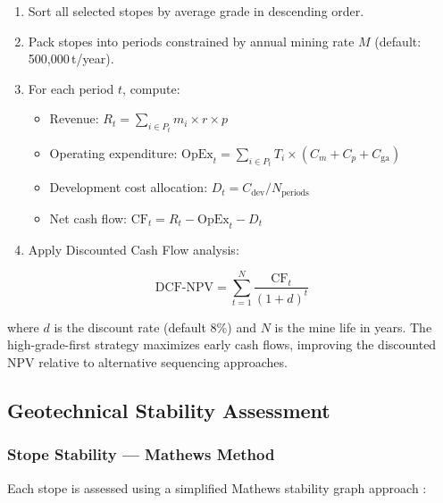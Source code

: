 \documentclass[12pt,a4paper]{article}
\begin{document}
\begin{enumerate}
    \item Sort all selected stopes by average grade in descending order.
    \item Pack stopes into periods constrained by annual mining rate $M$ (default: 500{,}000\,t/year).
    \item For each period $t$, compute:
    \begin{itemize}
        \item Revenue: $R_t = \sum_{i \in P_t} m_i \times r \times p$
        \item Operating expenditure: $\text{OpEx}_t = \sum_{i \in P_t} T_i \times (C_m + C_p + C_{\text{ga}})$
        \item Development cost allocation: $D_t = C_{\text{dev}} / N_{\text{periods}}$
        \item Net cash flow: $\text{CF}_t = R_t - \text{OpEx}_t - D_t$
    \end{itemize}
    \item Apply Discounted Cash Flow analysis:
\end{enumerate}

\begin{equation}
    \text{DCF-NPV} = \sum_{t=1}^{N} \frac{\text{CF}_t}{(1 + d)^t}
\end{equation}

where $d$ is the discount rate (default 8\%) and $N$ is the mine life in years. The high-grade-first strategy maximizes early cash flows, improving the discounted NPV relative to alternative sequencing approaches.

\subsection{Geotechnical Stability Assessment}
\label{sec:geotech}

\subsubsection{Stope Stability --- Mathews Method}

Each stope is assessed using a simplified Mathews stability graph approach \cite{mathews1981,potvin1988}:
\end{document}
